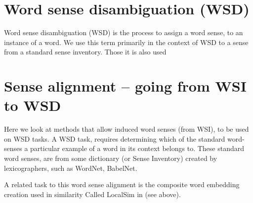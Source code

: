 \documentclass{article}
\begin{document}
\section{Word sense disambiguation (WSD)}
Word sense disambiguation (WSD) is the process to assign a word sense, to an instance of a word. We use this term primarily in the context of WSD to a sense from a standard sense inventory. Those it is also used 



\section{Sense alignment -- going from WSI to WSD}
Here we look at methods that allow induced word senses (from WSI), to be used on WSD tasks.
A WSD task, requires determining which of the standard word-senses a particular example of a word in its context belongs to.
These standard word senses, are from some dictionary (or Sense Inventory) created by 
lexicographers, such as WordNet, BabelNet.

A related task to this word sense alignment is the composite word embedding creation used in similarity Called LocalSim in \textcite{Huang2012} (see above).






\end{document}
